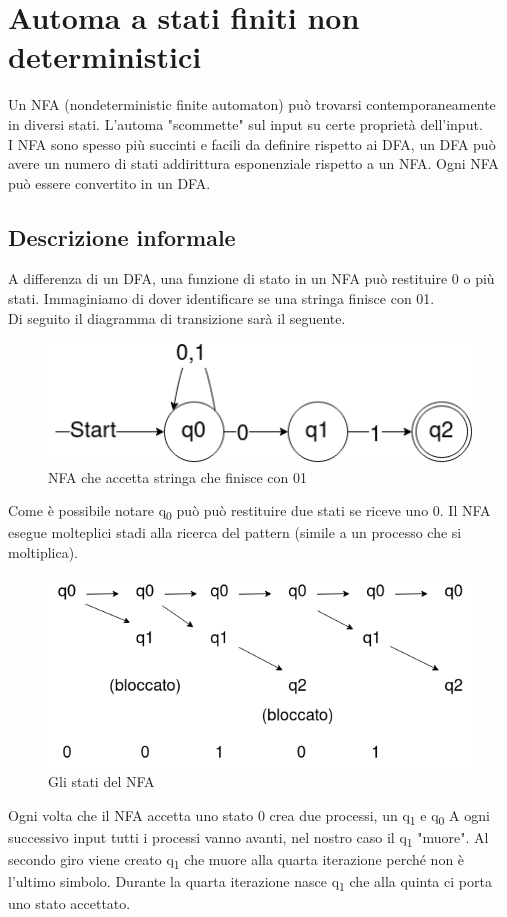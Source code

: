 \documentclass[12pt]{article}
\begin{document}
\section{Automa a stati finiti non deterministici}
Un NFA (nondeterministic finite automaton) può trovarsi contemporaneamente in diversi stati. L'automa "scommette" sul input su certe proprietà dell'input.
\\ I NFA sono spesso più succinti e facili da definire rispetto ai DFA, un DFA può avere un numero di stati addirittura esponenziale rispetto a un NFA. Ogni NFA può essere convertito in un DFA.

\newpage
\subsection{Descrizione informale}
A differenza di un DFA, una funzione di stato in un NFA può restituire 0 o più stati. Immaginiamo di dover identificare se una stringa finisce con 01.
\\ Di seguito il diagramma di transizione sarà il seguente.
\begin{figure}[h]
	\includegraphics[scale = 0.5]{media/01_end.png}
	\centering
	\caption{NFA che accetta stringa che finisce con 01}
\end{figure}
Come è possibile notare q\textsubscript{0} può può restituire due stati se riceve uno 0. Il NFA esegue molteplici stadi alla ricerca del pattern (simile a un processo che si moltiplica).

\begin{figure}[h]
	\includegraphics[scale = 0.5]{media/NFA_es.png}
	\centering
	\caption{Gli stati del NFA}
\end{figure}
Ogni volta che il NFA accetta uno stato 0 crea due processi, un q\textsubscript{1} e q\textsubscript{0}
A ogni successivo input tutti i processi vanno avanti, nel nostro caso il q\textsubscript{1} "muore". Al secondo giro viene creato q\textsubscript{1} che muore alla quarta iterazione perché non è l'ultimo simbolo. Durante la quarta iterazione nasce q\textsubscript{1} che alla quinta ci porta uno stato accettato.
\end{document}
